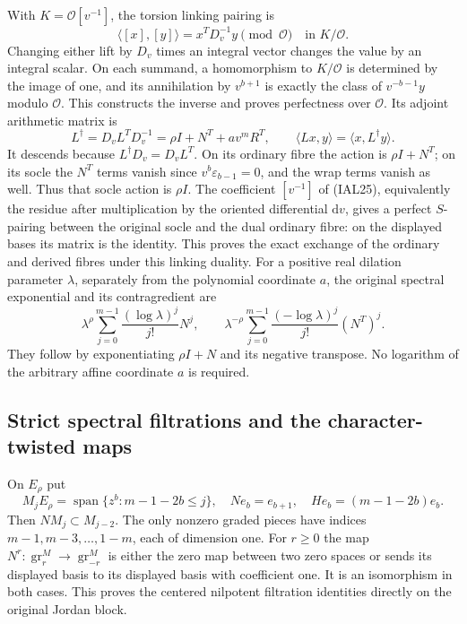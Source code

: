 \documentclass[11pt,a4paper]{article}
\theoremstyle{definition}
\begin{document}
With $K=\mathcal O[v^{-1}]$, the torsion linking pairing is
\begin{equation}
 \langle[x],[y]\rangle=x^TD_v^{-1}y\pmod{\mathcal O}
     \quad\text{in }K/\mathcal O.                    \tag{IAL25}
\end{equation}
Changing either lift by $D_v$ times an integral vector changes the
value by an integral scalar.  On each summand, a homomorphism to
$K/\mathcal O$ is determined by the image of one, and its annihilation
by $v^{b+1}$ is exactly the class of $v^{-b-1}y$ modulo $\mathcal O$.
This constructs the inverse and proves perfectness over $\mathcal O$.
Its adjoint arithmetic matrix is
\begin{equation}
 L^\dagger=D_vL^TD_v^{-1}
         =\rho I+N^T+av^mR^T,
 \qquad \langle Lx,y\rangle=\langle x,L^\dagger y\rangle.
                                                        \tag{IAL26}
\end{equation}
It descends because $L^\dagger D_v=D_vL^T$.  On its ordinary fibre
the action is $\rho I+N^T$; on its socle the $N^T$ terms vanish since
$v^b\varepsilon_{b-1}=0$, and the wrap terms vanish as well.  Thus
that socle action is $\rho I$.
The coefficient $[v^{-1}]$ of (IAL25), equivalently the residue after
multiplication by the oriented differential $\mathrm d v$, gives a
perfect $S$-pairing between the original socle and the dual ordinary
fibre: on the displayed bases its matrix is the identity.  This proves
the exact exchange of the ordinary and
derived fibres under this linking duality.
For a positive real dilation parameter $\lambda$, separately from
the polynomial coordinate $a$, the original spectral exponential and
its contragredient are
\begin{equation}
 \lambda^\rho\sum_{j=0}^{m-1}\frac{(\log\lambda)^j}{j!}N^j,
 \qquad
 \lambda^{-\rho}\sum_{j=0}^{m-1}\frac{(-\log\lambda)^j}{j!}(N^T)^j.
                                                        \tag{IAL27}
\end{equation}
They follow by exponentiating $\rho I+N$ and its negative transpose.
No logarithm of the arbitrary affine coordinate $a$ is required.

\subsection{Strict spectral filtrations and the character-twisted maps}
On $E_\rho$ put
\begin{equation}
 M_jE_\rho=\operatorname{span}\{z^b:m-1-2b\leq j\},
 \quad Ne_b=e_{b+1},\quad H e_b=(m-1-2b)e_b.
                                                        \tag{IAL28}
\end{equation}
Then $N M_j\subset M_{j-2}$.  The only nonzero graded pieces have
indices $m-1,m-3,\ldots,1-m$, each of dimension one.  For $r\geq0$
the map $N^r:\operatorname{gr}^M_r\to\operatorname{gr}^M_{-r}$
is either the zero map between two zero spaces or sends its displayed
basis to its displayed basis with coefficient one.  It is an
isomorphism in both cases.  This proves the centered nilpotent
filtration identities directly on the original Jordan block.
\end{document}
